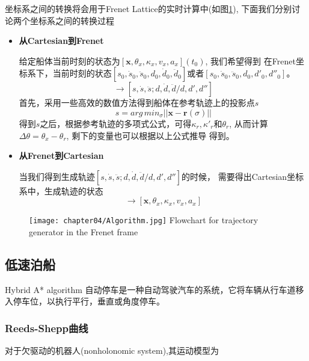 坐标系之间的转换将会用于Frenet Lattice的实时计算中(如图\ref{fig:frenetalgorithm}),
下面我们分别讨论两个坐标系之间的转换过程
\begin{itemize}
  \item \textbf{从Cartesian到Frenet}

  给定船体当前时刻的状态为$[\bm{x},\theta_x, \kappa_x, v_x, a_x](t_0)$, 我们希望得到
  在Frenet坐标系下，当前时刻的状态$[s_0, \dot{s}_0, \ddot{s}_0, d_0, \dot{d}_0,
  \ddot{d}_0]$或者$[s_0, \dot{s}_0, \ddot{s}_0, d_0, d'_0, d''_0]$。
  \begin{equation}
    [\bm{x}, \theta_x, \kappa_x, v_x, a_x]  \rightarrow
    [s, \dot{s}, \ddot{s}; d, \dot{d},\ddot{d}/d, d', d'']
  \end{equation}
  首先，采用一些高效的数值方法得到船体在参考轨迹上的投影点$s$
  \begin{equation}
    s= arg\,min_{\sigma} || \bm{x}-\bm{r}(\sigma)||
  \end{equation}
  得到$s$之后，根据参考轨迹的多项式公式，可得${\kappa}_r, {\kappa}'_r$和${\theta}_r$,
  从而计算$\Delta \theta = {\theta}_x-{\theta}_r $, 剩下的变量也可以根据以上公式推导
  得到。

  \item \textbf{从Frenet到Cartesian}

  当我们得到生成轨迹$[s, \dot{s}, \ddot{s}; d, \dot{d},\ddot{d}/d, d', d'']$的时候，
  需要得出Cartesian坐标系中，生成轨迹的状态
  \begin{equation}
    [s, \dot{s}, \ddot{s}; d, \dot{d},\ddot{d}/d, d', d''] \rightarrow
    [\bm{x}, \theta_x, \kappa_x, v_x, a_x]
  \end{equation}

\end{itemize}

\begin{figure}[!htp]
  \centering
  \texttt{[image: chapter04/Algorithm.jpg]}
    {Flowchart for trajectory generator in the Frenet frame}
  \label{fig:frenetalgorithm}
\end{figure}


\subsection{低速泊船}
Hybrid A* algorithm
自动停车是一种自动驾驶汽车的系统，它将车辆从行车道移入停车位，以执行平行，垂直或角度停车。

\subsubsection{Reeds-Shepp曲线}
对于欠驱动的机器人(nonholonomic system),其运动模型为

